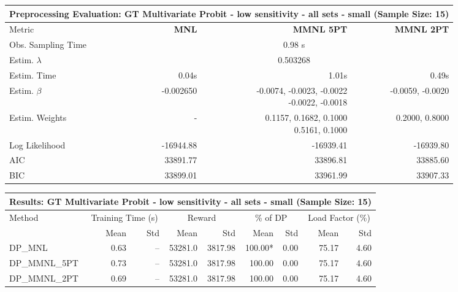 
\begin{samepage}
\begin{center}
  \small
  \begin{tabular}{l|r|r|r}
    \toprule
    \multicolumn{4}{c}{\textbf{Preprocessing Evaluation: GT Multivariate Probit - low sensitivity - all sets - small (Sample Size: 15)}} \\
    \midrule
    Metric & \textbf{MNL} & \textbf{MMNL 5PT} & \textbf{MMNL 2PT} \\
    \midrule
    Obs. Sampling Time & \multicolumn{3}{c}{0.98 s} \\
    Estim. $\lambda$ & \multicolumn{3}{c}{0.503268} \\
    Estim. Time & 0.04s & 1.01s & 0.49s \\
    Estim. $\beta$ & -0.002650 & \makecell[tr]{-0.0074, -0.0023, -0.0022 \\ -0.0022, -0.0018} & -0.0059, -0.0020 \\
    Estim. Weights & - & \makecell[tr]{0.1157, 0.1682, 0.1000 \\ 0.5161, 0.1000} & 0.2000, 0.8000 \\
    Log Likelihood & -16944.88 & -16939.41 & -16939.80 \\
    AIC & 33891.77 & 33896.81 & 33885.60 \\
    BIC & 33899.01 & 33961.99 & 33907.33 \\
    \bottomrule
  \end{tabular}
\end{center}
\begin{center}
  \small
  \begin{tabular}{l|rr|rr|rr|rr}
    \toprule
    \multicolumn{9}{c}{\textbf{Results: GT Multivariate Probit - low sensitivity - all sets - small (Sample Size: 15)}} \\
    \midrule
    Method & \multicolumn{2}{c|}{Training Time (s)} & \multicolumn{2}{c|}{Reward} & \multicolumn{2}{c|}{\% of DP} & \multicolumn{2}{c}{Load Factor (\%)} \\
    & Mean & Std & Mean & Std & Mean & Std & Mean & Std \\
    \midrule
    DP\_MNL      &     0.63 &    -- &    53281.0 &    3817.98 & 100.00* &    0.00 &   75.17 &    4.60 \\
    DP\_MMNL\_5PT &     0.73 &    -- &    53281.0 &    3817.98 &  100.00 &    0.00 &   75.17 &    4.60 \\
    DP\_MMNL\_2PT &     0.69 &    -- &    53281.0 &    3817.98 &  100.00 &    0.00 &   75.17 &    4.60 \\

\end{tabular}
\end{center}
\end{samepage}
